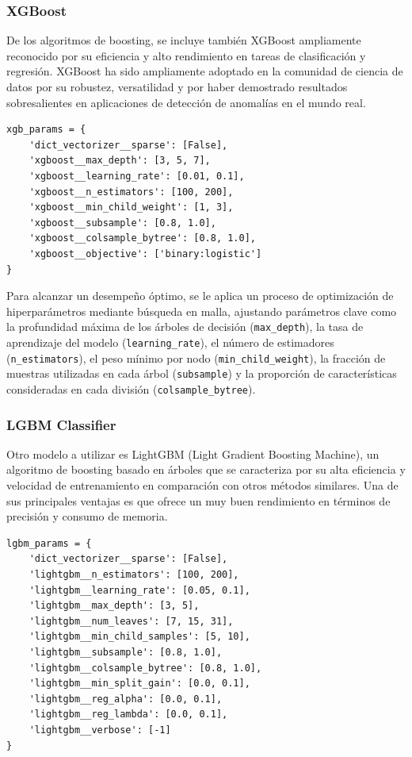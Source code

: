\documentclass[11pt,a4paper,spanish]{book}
\numberwithin{equation}{chapter}
\numberwithin{figure}{chapter}
\begin{document}
\subsubsection{XGBoost}

De los algoritmos de boosting, se incluye también XGBoost ampliamente reconocido por su 
eficiencia y alto rendimiento en tareas de clasificación y regresión. XGBoost ha sido 
ampliamente adoptado en la comunidad de ciencia de datos por su robustez, versatilidad y 
por haber demostrado resultados sobresalientes en aplicaciones de detección de anomalías 
en el mundo real.


\vspace{5mm}
\begin{lstlisting}
xgb_params = {
    'dict_vectorizer__sparse': [False],
    'xgboost__max_depth': [3, 5, 7],
    'xgboost__learning_rate': [0.01, 0.1],
    'xgboost__n_estimators': [100, 200],
    'xgboost__min_child_weight': [1, 3],
    'xgboost__subsample': [0.8, 1.0],
    'xgboost__colsample_bytree': [0.8, 1.0],
    'xgboost__objective': ['binary:logistic']
}
\end{lstlisting}

Para alcanzar un desempeño óptimo, se le aplica un proceso de optimización de 
hiperparámetros mediante búsqueda en malla, ajustando parámetros clave como la 
profundidad máxima de los árboles de decisión (\lstinline|max_depth|), la tasa de 
aprendizaje del modelo (\lstinline|learning_rate|), el número de estimadores 
(\lstinline|n_estimators|), el peso mínimo por nodo (\lstinline|min_child_weight|), la 
fracción de muestras utilizadas en cada árbol (\lstinline|subsample|) y la proporción de 
características consideradas en cada división (\lstinline|colsample_bytree|). 


\subsubsection{LGBM Classifier}

Otro modelo a utilizar es LightGBM (Light Gradient Boosting Machine), un algoritmo de 
boosting basado en árboles que se caracteriza por su alta eficiencia y velocidad de 
entrenamiento en comparación con otros métodos similares. Una de sus principales ventajas 
es que ofrece un muy buen rendimiento en términos de precisión y consumo de memoria. 


\vspace{5mm}
\begin{lstlisting}
lgbm_params = {
    'dict_vectorizer__sparse': [False],
    'lightgbm__n_estimators': [100, 200],
    'lightgbm__learning_rate': [0.05, 0.1],  
    'lightgbm__max_depth': [3, 5],  
    'lightgbm__num_leaves': [7, 15, 31],  
    'lightgbm__min_child_samples': [5, 10],  
    'lightgbm__subsample': [0.8, 1.0],
    'lightgbm__colsample_bytree': [0.8, 1.0],
    'lightgbm__min_split_gain': [0.0, 0.1],  
    'lightgbm__reg_alpha': [0.0, 0.1],  
    'lightgbm__reg_lambda': [0.0, 0.1],  
    'lightgbm__verbose': [-1]  
}
\end{lstlisting}
\end{document}
